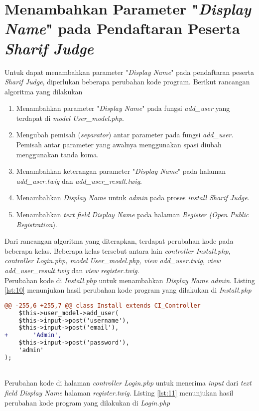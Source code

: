 \section{Menambahkan Parameter "\textit{Display Name}" pada Pendaftaran Peserta \textit{Sharif Judge}}
Untuk dapat menambahkan parameter "\textit{Display Name}" pada pendaftaran peserta \textit{Sharif Judge}, diperlukan beberapa perubahan kode program. Berikut rancangan algoritma yang dilakukan
\begin{enumerate}
	\item Menambahkan parameter "\textit{Display Name}" pada fungsi \textit{add\_user} yang terdapat di \textit{model User\_model.php}.
	\item Mengubah pemisah (\textit{separator}) antar parameter pada fungsi \textit{add\_user}. Pemisah antar parameter yang awalnya menggunakan spasi diubah menggunakan tanda koma.
	\item Menambahkan keterangan parameter "\textit{Display Name}" pada halaman \textit{add\_user.twig} dan  \textit{add\_user\_result.twig}.
	\item Menambahkan \textit{Display Name} untuk \textit{admin} pada proses \textit{install Sharif Judge}.
	\item Menambahkan \textit{text field Display Name} pada halaman \textit{Register} \textit{(Open Public Registration}).
\end{enumerate}
Dari rancangan algoritma yang diterapkan, terdapat perubahan kode pada beberapa kelas. Beberapa kelas tersebut antara lain \textit{controller Install.php, controller Login.php, model User\_model.php, view add\_user.twig, view add\_user\_result.twig} dan \textit{view register.twig}.
~\\
Perubahan kode di \textit{Install.php} untuk menambahkan \textit{Display Name admin}. Listing \ref{lst:10} menunjukan hasil perubahan kode program yang dilakukan di \textit{Install.php}

\begin{lstlisting}[language=diff, caption=Perubahan kode program pada \textit{Install.php}, label=lst:10, basicstyle=\ttfamily, frame=single,
columns=fullflexible, keepspaces=true, breaklines=true]
@@ -255,6 +255,7 @@ class Install extends CI_Controller
	$this->user_model->add_user(
	$this->input->post('username'),
	$this->input->post('email'),
+   	'Admin',
	$this->input->post('password'),
	'admin'
);
\end{lstlisting}
~\\
Perubahan kode di halaman \textit{controller Login.php} untuk menerima \textit{input} dari \textit{text field Display Name} halaman \textit{register.twig}. Listing \ref{lst:11} menunjukan hasil perubahan kode program yang dilakukan di \textit{Login.php}

